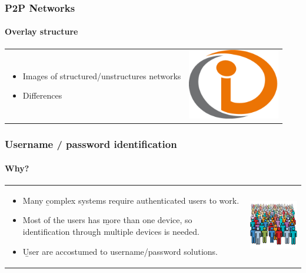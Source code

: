 \begin{frame}
\frametitle{P2P Networks}
\framesubtitle{Overlay structure}
\begin{table}
\begin{tabular}{p{7cm}p{3cm}}
\begin{itemize}
    \item Images of structured/unstructures networks
    \item Differences
\end{itemize}
&
\vspace{1.5cm}
\includegraphics[width=4cm]{img/example}\\
\end{tabular}
\end{table}
\end{frame}

\begin{frame}
\frametitle{Username / password identification}
\framesubtitle{Why?}
\begin{table}
\begin{tabular}{p{7cm}p{3cm}}
\begin{itemize}
  \item Many \b{complex systems} require authenticated users to work.
  \item Most of the users has \b{more than one device}, so identification through
    multiple devices is needed.
  \item \b{User are accostumed} to username/password solutions.
\end{itemize}
&
\vspace{1.5cm}
\includegraphics[width=4cm]{img/users}\\
\end{tabular}
\end{table}
\end{frame}

